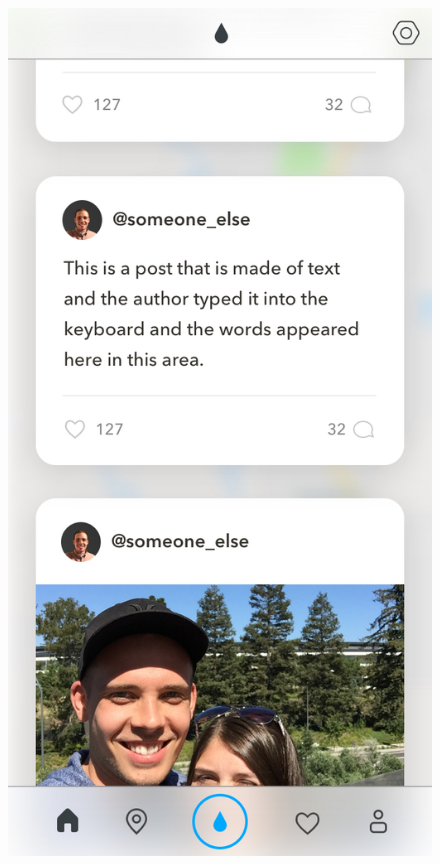\documentclass[draftclsnofoot, onecolumn,journal,letterpaper,10pt, compsoc]{IEEEtran}
\begin{document}
\begin{figure}[!htb]
    \centering
    \includegraphics[scale=.25]{home.jpg}

\end{figure}
\end{document}
